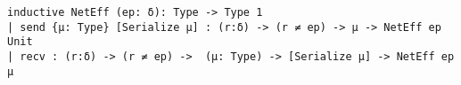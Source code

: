 \begin{lstlisting}[language=lean]
inductive NetEff (ep: δ): Type -> Type 1
| send {μ: Type} [Serialize μ] : (r:δ) -> (r ≠ ep) -> μ -> NetEff ep Unit
| recv : (r:δ) -> (r ≠ ep) ->  (μ: Type) -> [Serialize μ] -> NetEff ep μ
\end{lstlisting}
